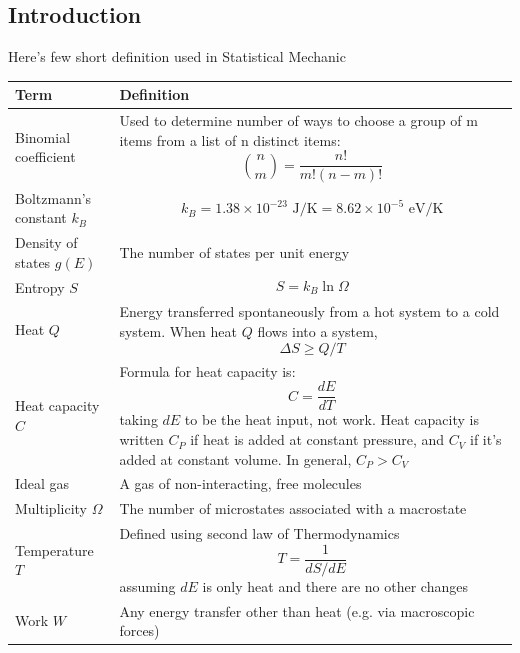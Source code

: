 \documentclass[../../../main.tex]{subfiles}
\begin{document}
\subsection{Introduction}
Here's few short definition used in Statistical Mechanic 
\begin{center}
    \begin{longtable}{|p{}| p{}|}
        \hline
        Term&Definition\\\hline\hline
        Binomial coefficient& Used to determine number of ways to choose a group of m items from a list of n distinct items: \begin{equation*} \binom{n}{m} = \frac{n!}{m!(n-m)!} \end{equation*}\\\hline
        Boltzmann's constant $k_B$&  \begin{equation*}
            k_B=1.38 \times 10^{-23} \text{ J/K} = 8.62 \times 10^{-5} \text{ eV/K}
        \end{equation*}\\\hline
        Density of states $g(E)$&The number of states per unit energy\\\hline
        Entropy $S$&\begin{equation*}
            S=k_B\ln \Omega
        \end{equation*}\\\hline
        Heat $Q$&Energy transferred spontaneously from a hot system to a cold system. When heat $Q$ flows into a system, \begin{equation*}
            \Delta S \geq Q/T
        \end{equation*}\\\hline
        Heat capacity $C$&Formula for heat capacity is:\begin{equation*}
            C=\frac{dE}{dT}
        \end{equation*}taking $dE$ to be the heat input, not work. Heat capacity is written $C_P$ if heat is added at constant pressure,
        and $C_V$ if it's added at constant volume. In general, $C_P > C_V$\\\hline
        Ideal gas&A gas of non-interacting, free molecules\\\hline
        Multiplicity $\Omega$&The number of microstates associated with a macrostate\\\hline
        Temperature $T$&Defined using second law of Thermodynamics\begin{equation*}
            T=\frac{1}{dS/dE}
        \end{equation*}
        assuming $dE$ is only heat and there are no other changes\\\hline
        Work $W$&Any energy transfer other than heat (e.g. via macroscopic forces)\\\hline
    \end{longtable}
\end{center}
\end{document}
